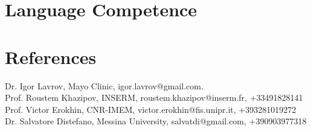 \documentclass{moderncv}
\begin{document}
\section{Language Competence}


\section{References}

Dr. Igor Lavrov, Mayo Clinic, igor.lavrov@gmail.com.\\
Prof. Roustem Khazipov, INSERM, roustem.khazipov@inserm.fr, +33491828141\\
Prof. Victor Erokhin, CNR-IMEM, victor.erokhin@fis.unipr.it, +393281019272\\
Dr. Salvatore Distefano, Messina University, salvatdi@gmail.com, +390903977318
\end{document}
